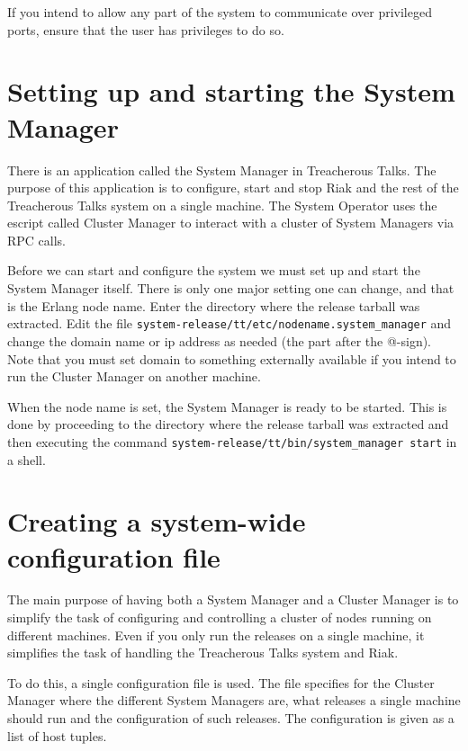 \documentclass[11pt,a4paper]{report}
\begin{document}
If you intend to allow any part of the system to communicate over privileged
ports, ensure that the user has privileges to do so.
\section{Setting up and starting the System Manager}
There is an application called the System Manager in Treacherous Talks. The
purpose of this application is to configure, start and stop Riak and the rest of
the Treacherous Talks system on a single machine. The System Operator uses the
escript called Cluster Manager to interact with a cluster of System Managers via
RPC calls.

\begin{sloppypar}
Before we can start and configure the system we must set up and start the System
Manager itself. There is only one major setting one can change, and that is the
Erlang node name. Enter the directory where the release tarball was extracted.
Edit the file {\tt system-release/tt/etc/nodename.system\_manager} and change
the domain name or ip address as needed (the part after the @-sign). Note that
you must set domain to something externally available if you intend to run the
Cluster Manager on another machine.
\end{sloppypar}

\begin{sloppypar}
When the node name is set, the System Manager is ready to be started. This is
done by proceeding to the directory where the release tarball was extracted and
then executing the command {\tt system-release/tt/bin/system\_manager start} in
a shell.
\end{sloppypar}
\section{Creating a system-wide configuration file}
The main purpose of having both a System Manager and a Cluster Manager is to
simplify the task of configuring and controlling a cluster of nodes running on
different machines. Even if you only run the releases on a single machine, it
simplifies the task of handling the Treacherous Talks system and Riak.

To do this, a single configuration file is used. The file specifies for the
Cluster Manager where the different System Managers are, what releases a single
machine should run and the configuration of such releases. The configuration is
given as a list of host tuples.
\end{document}

